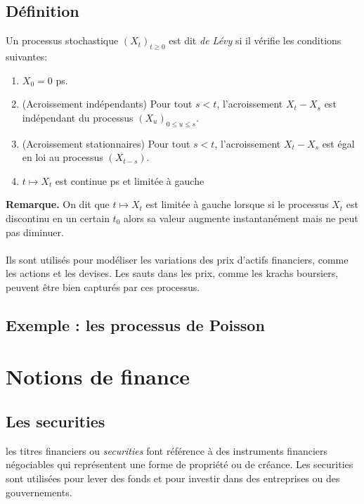 \documentclass[a4paper]{article}
\begin{document}
\subsection{Définition}
Un processus stochastique $(X_t)_{t\geq 0}$ est dit \textit{de Lévy} si il vérifie les conditions suivantes:
\begin{enumerate}[label=\textit{(\roman*)}]
\item $X_0 = 0$ ps.
\item (Acroissement indépendants) Pour tout $s < t$, l'acroissement $X_t - X_s$ est indépendant du processus $(X_u)_{0\leq u \leq s}$.
\item (Acroissement stationnaires) Pour tout $s < t$, l'acroissement $X_t - X_s$ est égal en loi au processus  $(X_{t-s})$.
\item $t \mapsto X_t$ est continue ps et limitée à gauche
\end{enumerate}
\textbf{Remarque.} On dit que $t \mapsto X_t$ est limitée à gauche lorsque si le processus $X_t$ est discontinu en un certain $t_0$ alors sa valeur augmente instantanément mais ne peut pas diminuer. \\
\vspace{1mm}
\\
Ils sont utilisés pour modéliser les variations des prix d'actifs financiers, comme les actions et les devises. Les sauts dans les prix, comme les krachs boursiers, peuvent être bien capturés par ces processus.
\subsection{Exemple : les processus de Poisson}


\section{Notions de finance}
\subsection{Les securities}
les titres financiers ou \textit{securities} font référence à des instruments financiers négociables qui représentent une forme de propriété ou de créance. Les securities sont utilisées pour lever des fonds et pour investir dans des entreprises ou des gouvernements.
\end{document}
